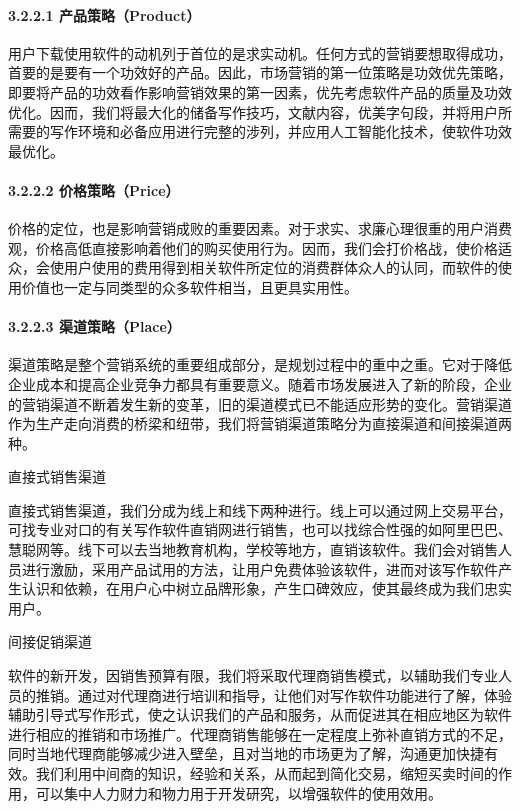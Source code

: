\documentclass[10pt,letterpaper]{article}
\begin{document}
\paragraph{3.2.2.1 产品策略（Product）}

\rule{0pt}{0pt} 

用户下载使用软件的动机列于首位的是求实动机。任何方式的营销要想取得成功，首要的是要有一个功效好的产品。因此，市场营销的第一位策略是功效优先策略，即要将产品的功效看作影响营销效果的第一因素，优先考虑软件产品的质量及功效优化。因而，我们将最大化的储备写作技巧，文献内容，优美字句段，并将用户所需要的写作环境和必备应用进行完整的涉列，并应用人工智能化技术，使软件功效最优化。

\paragraph{3.2.2.2 价格策略（Price）}

\rule{0pt}{0pt} 

价格的定位，也是影响营销成败的重要因素。对于求实、求廉心理很重的用户消费观，价格高低直接影响着他们的购买使用行为。因而，我们会打价格战，使价格适众，会使用户使用的费用得到相关软件所定位的消费群体众人的认同，而软件的使用价值也一定与同类型的众多软件相当，且更具实用性。

\paragraph{3.2.2.3 渠道策略（Place）}

\rule{0pt}{0pt} 

渠道策略是整个营销系统的重要组成部分，是规划过程中的重中之重。它对于降低企业成本和提高企业竞争力都具有重要意义。随着市场发展进入了新的阶段，企业的营销渠道不断着发生新的变革，旧的渠道模式已不能适应形势的变化。营销渠道作为生产走向消费的桥梁和纽带，我们将营销渠道策略分为直接渠道和间接渠道两种。

直接式销售渠道

直接式销售渠道，我们分成为线上和线下两种进行。线上可以通过网上交易平台，可找专业对口的有关写作软件直销网进行销售，也可以找综合性强的如阿里巴巴、慧聪网等。线下可以去当地教育机构，学校等地方，直销该软件。我们会对销售人员进行激励，采用产品试用的方法，让用户免费体验该软件，进而对该写作软件产生认识和依赖，在用户心中树立品牌形象，产生口碑效应，使其最终成为我们忠实用户。

间接促销渠道

软件的新开发，因销售预算有限，我们将采取代理商销售模式，以辅助我们专业人员的推销。通过对代理商进行培训和指导，让他们对写作软件功能进行了解，体验辅助引导式写作形式，使之认识我们的产品和服务，从而促进其在相应地区为软件进行相应的推销和市场推广。代理商销售能够在一定程度上弥补直销方式的不足，同时当地代理商能够减少进入壁垒，且对当地的市场更为了解，沟通更加快捷有效。我们利用中间商的知识，经验和关系，从而起到简化交易，缩短买卖时间的作用，可以集中人力财力和物力用于开发研究，以增强软件的使用效用。
\end{document}
